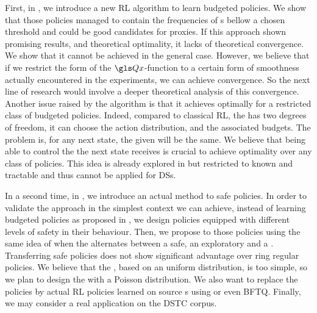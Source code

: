 First, in , we introduce a new  \gls{RL} algorithm to learn budgeted policies. We show that those policies managed to contain the  frequencies of s bellow a chosen threshold and could be good candidates for proxies. If this approach shown promising results, and theoretical optimality, it lacks of theoretical convergence. We show that it cannot be achieved in the general case. However, we believe that if we restrict the form of the $\Q$-function to a certain form of smoothness actually encountered in the experiments, we can achieve convergence. So the next line of research would involve a deeper theoretical analysis of this convergence. Another issue raised by the algorithm is that it achieves optimally for a restricted class of budgeted policies. Indeed, compared to classical \gls{RL}, the  has two degrees of freedom, it can choose the action distribution, and the associated budgets. The problem is, for any next state, the  given will be the same. We believe that being able to control the  the next state receives is crucial to achieve optimality over any class of policies. This idea is already explored in \parencite{Boutilier_Lu:uai16} but restricted to known and tractable  and thus cannot be applied for \glspl{DS}.

In a second time, in , we introduce an actual method to  safe policies. In order to validate the approach in the simplest context we can achieve, instead of learning budgeted policies as proposed in , we design  policies equipped with different levels of safety in their behaviour. Then, we propose to  those policies using the same idea of  when the  alternates between a safe, an exploratory and a  . Transferring safe policies does not show significant advantage over ring regular policies. We believe that the , based on an uniform distribution,
is too simple,
so we plan to design the  with a Poisson distribution. We also want to replace the  policies by actual \gls{RL} policies learned on source s using  or even \gls{BFTQ}. Finally, we may consider a real application on the \acrlong{DSTC} corpus. %

